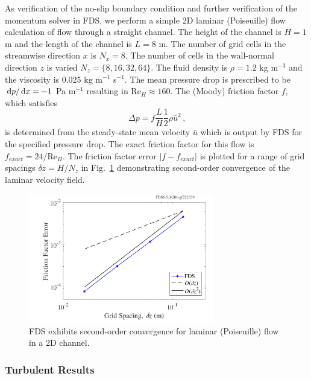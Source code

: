 \documentclass[11pt]{book}
\begin{document}
As verification of the no-slip boundary condition and further verification of the momentum solver in FDS, we perform a simple 2D laminar (Poiseuille) flow calculation of
flow through a straight channel.
The height of the channel is $H=1$ m and the length of the channel is $L=8$ m.
The number of grid cells in the streamwise direction $x$ is $N_x = 8$.  The number of cells in the wall-normal direction $z$ is varied $N_z = \{8,16,32,64\}$.
The fluid density is $\rho = 1.2$ kg m$^{-3}$ and the viscosity is $0.025$ kg m$^{-1}$ s$^{-1}$.
The mean pressure drop is prescribed to be $\,\mathrm{d} p/ \,\mathrm{d} x = -1$ Pa m$^{-1}$ resulting in Re$_H \approx 160$.  The (Moody) friction factor $f$, which satisfies
\begin{equation}
\label{eqn_moodyf}
\Delta p = f \frac{L}{H} \frac{1}{2} \rho \bar{u}^2 \,\mbox{,}
\end{equation}
is determined from the steady-state mean velocity $\bar{u}$ which is output by FDS for the specified pressure drop.  The exact friction factor for this flow is $f_{exact} = 24/\mbox{Re}_H$.  The friction factor error $|f-f_{exact}|$ is plotted for a range of grid spacings $\delta z = H/N_z$ in Fig.~\ref{fig_poiseuille_convergence} demonstrating second-order convergence of the laminar velocity field.
\begin{figure}
   \begin{center}
      \includegraphics[width=3.2in]{SCRIPT_FIGURES/poiseuille_convergence}
      \caption[Convergence for laminar (Poiseuille) flow in a 2D channel]{\label{fig_poiseuille_convergence} FDS exhibits second-order convergence for laminar (Poiseuille) flow in a 2D channel.}
   \end{center}
\end{figure}

\subsubsection{Turbulent Results}
\label{turbulent}
\end{document}
